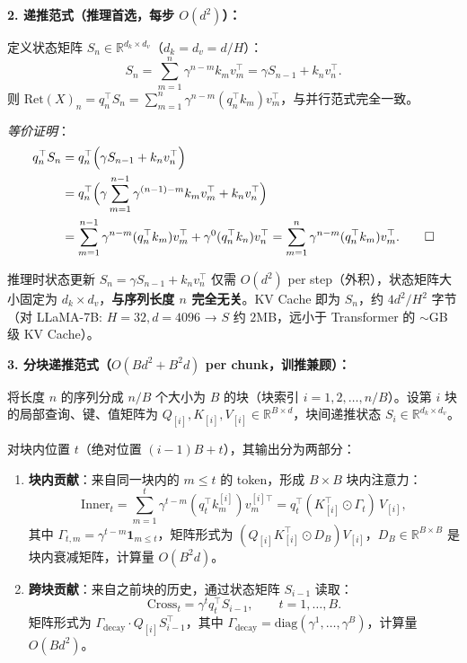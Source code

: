 \documentclass[12pt,a4paper]{article}
\begin{document}
\textbf{2. 递推范式（推理首选，每步 $O(d^2)$）：}

定义状态矩阵 $S_n \in \mathbb{R}^{d_k \times d_v}$（$d_k = d_v = d/H$）：
\begin{equation}
S_n = \sum_{m=1}^n \gamma^{n-m} k_m v_m^\top = \gamma S_{n-1} + k_n v_n^\top.
\end{equation}
则 $\mathrm{Ret}(X)_n = q_n^\top S_n = \sum_{m=1}^n \gamma^{n-m} (q_n^\top k_m) v_m^\top$，与并行范式完全一致。

\textit{等价证明}：
\begin{align}
q_n^\top S_n &= q_n^\top \Bigl(\gamma S_{n-1} + k_n v_n^\top\Bigr)\\
&= q_n^\top \Bigl(\gamma \sum_{m=1}^{n-1} \gamma^{(n-1)-m} k_m v_m^\top + k_n v_n^\top\Bigr)\\
&= \sum_{m=1}^{n-1} \gamma^{n-m} (q_n^\top k_m) v_m^\top + \gamma^0 (q_n^\top k_n) v_n^\top
= \sum_{m=1}^n \gamma^{n-m} (q_n^\top k_m) v_m^\top. \qed
\end{align}

推理时状态更新 $S_n = \gamma S_{n-1} + k_n v_n^\top$ 仅需 $O(d^2)$ per step（外积），状态矩阵大小固定为 $d_k \times d_v$，\textbf{与序列长度 $n$ 完全无关}。KV Cache 即为 $S_n$，约 $4d^2/H^2$ 字节（对 LLaMA-7B: $H=32, d=4096$ → $S$ 约 $2$MB，远小于 Transformer 的 $\sim$GB 级 KV Cache）。

\textbf{3. 分块递推范式（$O(Bd^2 + B^2 d)$ per chunk，训推兼顾）：}

将长度 $n$ 的序列分成 $n/B$ 个大小为 $B$ 的块（块索引 $i = 1, 2, \ldots, n/B$）。设第 $i$ 块的局部查询、键、值矩阵为 $Q_{[i]}, K_{[i]}, V_{[i]} \in \mathbb{R}^{B \times d}$，块间递推状态 $S_i \in \mathbb{R}^{d_k \times d_v}$。

对块内位置 $t$（绝对位置 $(i-1)B + t$），其输出分为两部分：
\begin{enumerate}
    \item \textbf{块内贡献}：来自同一块内的 $m \le t$ 的 token，形成 $B \times B$ 块内注意力：
    \begin{equation}
    \text{Inner}_t = \sum_{m=1}^{t} \gamma^{t-m} (q_t^\top k_m^{[i]}) v_m^{[i]\top}
    = q_t^\top (K_{[i]}^\top \odot \Gamma_t)\, V_{[i]},
    \end{equation}
    其中 $\Gamma_{t,m} = \gamma^{t-m} \mathbf{1}_{m \le t}$，矩阵形式为 $(Q_{[i]} K_{[i]}^\top \odot D_B) V_{[i]}$，$D_B \in \mathbb{R}^{B \times B}$ 是块内衰减矩阵，计算量 $O(B^2 d)$。
    \item \textbf{跨块贡献}：来自之前块的历史，通过状态矩阵 $S_{i-1}$ 读取：
    \begin{equation}
    \text{Cross}_t = \gamma^t q_t^\top S_{i-1}, \qquad t = 1,\ldots,B.
    \end{equation}
    矩阵形式为 $\Gamma_{\text{decay}} \cdot Q_{[i]} S_{i-1}^\top$，其中 $\Gamma_{\text{decay}} = \mathrm{diag}(\gamma^1, \ldots, \gamma^B)$，计算量 $O(Bd^2)$。
\end{enumerate}
\end{document}
